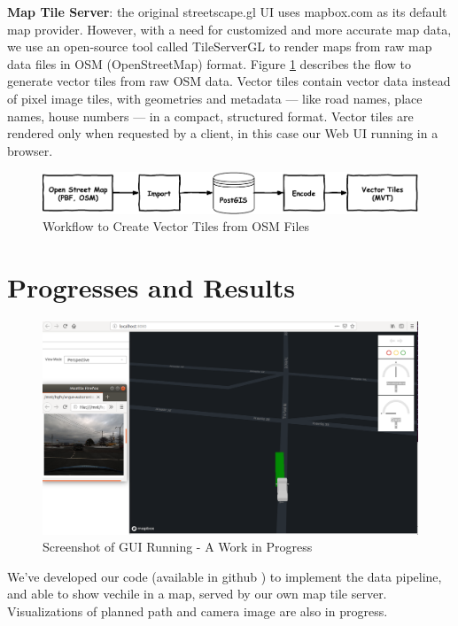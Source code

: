\documentclass{article}
\begin{document}
\textbf{Map Tile Server}: the original streetscape.gl UI uses mapbox.com as its default map provider. However, with a need for customized and more accurate map data, we use an open-source tool called TileServerGL \cite{vectortile1} to render maps from raw map data files in OSM (OpenStreetMap) format. Figure \ref{fig:map-flow} describes the flow to generate vector tiles from raw OSM data. Vector tiles contain vector data instead of pixel image tiles, with geometries and metadata — like road names, place names, house numbers — in a compact, structured format. Vector tiles are rendered only when requested by a client, in this case our Web UI running in a browser. 

\begin{figure}[htb]
  \centering
  \includegraphics[width=0.8\linewidth]{map-data-flow.pdf}
  \caption{Workflow to Create Vector Tiles from OSM Files}
  \label{fig:map-flow}
\end{figure}

\section{Progresses and Results}

\begin{figure}[hb]
  \centering
  \includegraphics[width=0.7\linewidth]{screenshot.png}
  \caption{Screenshot of GUI Running - A Work in Progress}
  \label{fig:screenshot}
\end{figure}

We've developed our code (available in github \cite{github}) to implement the data pipeline, and able to show vechile in a map, served by our own map tile server. Visualizations of planned path and camera image are also in progress.
\end{document}
